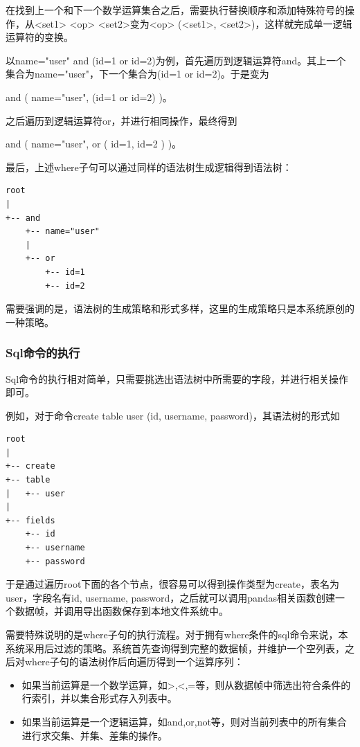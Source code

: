 在找到上一个和下一个数学运算集合之后，需要执行替换顺序和添加特殊符号的操作，从<set1> <op> <set2>变为<op> (<set1>, <set2>)，这样就完成单一逻辑运算符的变换。

以name="user" and (id=1 or id=2)为例，首先遍历到逻辑运算符and。其上一个集合为name="user"，下一个集合为(id=1 or id=2)。于是变为

and ( name="user", (id=1 or id=2) )。

之后遍历到逻辑运算符or，并进行相同操作，最终得到

and ( name="user", or ( id=1, id=2 ) )。

最后，上述where子句可以通过同样的语法树生成逻辑得到语法树：

\begin{lstlisting}
root
|
+-- and
    +-- name="user"
    |
    +-- or
        +-- id=1
        +-- id=2
\end{lstlisting}

需要强调的是，语法树的生成策略和形式多样，这里的生成策略只是本系统原创的一种策略。

\subsubsection{Sql命令的执行}

Sql命令的执行相对简单，只需要挑选出语法树中所需要的字段，并进行相关操作即可。

例如，对于命令create table user (id, username, password)，其语法树的形式如

\begin{lstlisting}
root
|
+-- create
+-- table 
|   +-- user
|
+-- fields
    +-- id
    +-- username
    +-- password
\end{lstlisting}

于是通过遍历root下面的各个节点，很容易可以得到操作类型为create，表名为user，字段名有id, username, password，之后就可以调用pandas相关函数创建一个数据帧，并调用导出函数保存到本地文件系统中。

需要特殊说明的是where子句的执行流程。对于拥有where条件的sql命令来说，本系统采用后过滤的策略。系统首先查询得到完整的数据帧，并维护一个空列表，之后对where子句的语法树作后向遍历得到一个运算序列：

\begin{itemize}
    \item 如果当前运算是一个数学运算，如>,<,=等，则从数据帧中筛选出符合条件的行索引，并以集合形式存入列表中。
    \item 如果当前运算是一个逻辑运算，如and,or,not等，则对当前列表中的所有集合进行求交集、并集、差集的操作。
\end{itemize}

